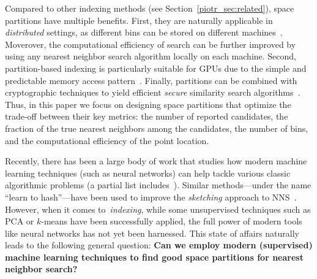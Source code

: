 \documentclass[11pt]{article}
\newcommand{\todoir}[2]{}
\newcommand{\irnote}[1]{\todoir{red}{IR: ``#1''}}
\newcommand{\twnote}[1]{\todoir{orange}{TW: ``#1''}}
\begin{document}
Compared to other indexing methods (see Section~\ref{piotr_sec:related}), space partitions have multiple benefits. First, they are naturally applicable in {\em distributed} settings, as different bins can be stored on different machines~\cite{bahmani2012efficient, nidetecting,  li2017losha, bhaskara2018distributed}. Moverover, the computational efficiency of search can be further improved by using any nearest neighbor search algorithm locally on each machine. Second, partition-based indexing is particularly suitable for GPUs due to the simple and predictable memory access pattern~\cite{johnson2017billion}. Finally, partitions can be combined with cryptographic techniques to yield efficient {\em secure} similarity search algorithms~\cite{chen2019sanns}. Thus, in this paper we focus on designing space partitions that optimize the trade-off between their key metrics: the number of reported candidates, the fraction of the true nearest neighbors among the candidates, the number of bins, and the computational efficiency of the point location.


Recently, there has been a large body of work that studies how modern machine learning
techniques (such as neural networks) can help tackle various classic algorithmic problems (a partial list includes~\cite{mousavi2015deep,bora2017compressed,khalil2017learning,kraska2017case, balcan2018learning,lykouris2018competitive,mitz2018model,purohit2018improving}).
Similar methods---under the name ``learn to hash''---have been used to improve the \emph{sketching} approach to NNS~\cite{wang2016learning}. 
However, when it comes to~\emph{indexing}, while some unsupervised techniques such as PCA or $k$-means have been successfully applied, the full power of modern tools like neural networks has not yet been harnessed. This state of affairs naturally
leads to the following general question:
    \textbf{Can we employ modern (supervised) machine learning techniques
    to find good space partitions for nearest neighbor search?}

%
\end{document}

